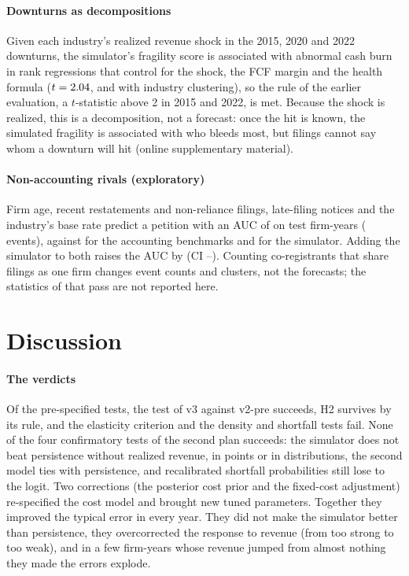 \documentclass[preprint,12pt,authoryear]{elsarticle}
\begin{document}
\paragraph{Downturns as decompositions} Given each industry's realized revenue shock in the 2015, 2020 and 2022 downturns, the simulator's fragility score is associated with abnormal cash burn in rank regressions that control for the shock, the FCF margin and the health formula ($t=2.04$, \EpiTwentyTRobust{} and \EpiTwentyTwoTRobust{} with industry clustering), so the rule of the earlier evaluation, a $t$-statistic above 2 in 2015 and 2022, is met. Because the shock is realized, this is a decomposition, not a forecast: once the hit is known, the simulated fragility is associated with who bleeds most, but filings cannot say whom a downturn will hit (online supplementary material).

\paragraph{Non-accounting rivals (exploratory)} Firm age, recent restatements and non-reliance filings, late-filing notices and the industry's base rate predict a petition with an AUC of \RivAucNonacc{} on \RivN{} test firm-years (\RivEv{} events), against \RivAucBench{} for the accounting benchmarks and \RivAucTwin{} for the simulator. Adding the simulator to both raises the AUC by \RivTwinBeyond{} (CI \RivTwinBeyondLo--\RivTwinBeyondHi). Counting co-registrants that share filings as one firm changes event counts and clusters, not the forecasts; the statistics of that pass are not reported here.



\section{Discussion}\label{sec:discussion}

\paragraph{The verdicts} Of the pre-specified tests, the test of v3 against v2-pre succeeds, H2 survives by its rule, and the elasticity criterion and the density and shortfall tests fail. None of the four confirmatory tests of the second plan succeeds: the simulator does not beat persistence without realized revenue, in points or in distributions, the second model ties with persistence, and recalibrated shortfall probabilities still lose to the logit. Two corrections (the posterior cost prior and the fixed-cost adjustment) re-specified the cost model and brought new tuned parameters. Together they improved the typical error in every year. They did not make the simulator better than persistence, they overcorrected the response to revenue (from too strong to too weak), and in a few firm-years whose revenue jumped from almost nothing they made the errors explode.
\end{document}
